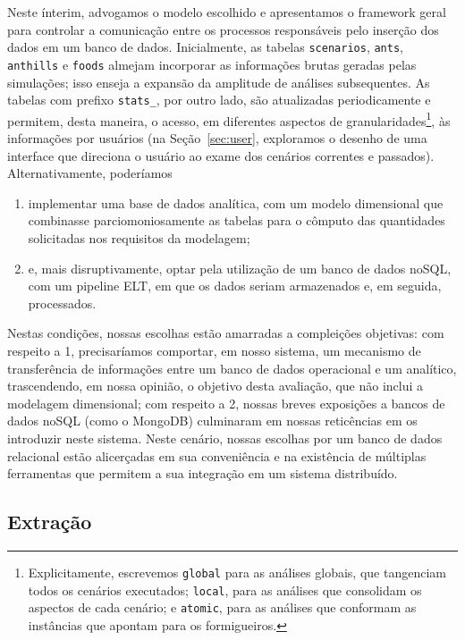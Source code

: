 \documentclass[12pt,oneside,a4paper]{article}
\begin{document}
	Neste ínterim, advogamos o modelo escolhido e apresentamos o framework geral para controlar a comunicação entre os processos responsáveis pelo inserção dos dados em um banco de dados. Inicialmente, as tabelas \texttt{scenarios}, \texttt{ants}, \texttt{anthills} e \texttt{foods} almejam incorporar as informações brutas geradas pelas simulações; isso enseja a expansão da amplitude de análises subsequentes. As tabelas com prefixo \texttt{stats\_}, por outro lado, são atualizadas periodicamente e permitem, desta maneira, o acesso, em diferentes aspectos de granularidades\footnote{Explicitamente, escrevemos \texttt{global} para as análises globais, que tangenciam todos os cenários executados; \texttt{local}, para as análises que consolidam os aspectos de cada cenário; e \texttt{atomic}, para as análises que conformam as instâncias que apontam para os formigueiros.}, às informações por usuários (na Seção~\ref{sec:user}, exploramos o desenho de uma interface que direciona o usuário ao exame dos cenários correntes e passados). Alternativamente, poderíamos 

	\begin{enumerate} 
		\item implementar uma base de dados analítica, com um modelo dimensional que combinasse parciomoniosamente as tabelas para o cômputo das quantidades solicitadas nos requisitos da modelagem;
		\item e, mais disruptivamente, optar pela utilização de um banco de dados noSQL, com um pipeline ELT, em que os dados seriam armazenados e, em seguida, processados. 
	\end{enumerate} 

	\noindent Nestas condições, nossas escolhas estão amarradas a compleições objetivas: com respeito a 1, precisaríamos comportar, em nosso sistema, um mecanismo de transferência de informações entre um banco de dados operacional e um analítico, trascendendo, em nossa opinião, o objetivo desta avaliação, que não inclui a modelagem dimensional; com respeito a 2, nossas breves exposições a bancos de dados noSQL (como o MongoDB) culminaram em nossas reticências em os introduzir neste sistema. Neste cenário, nossas escolhas por um banco de dados relacional estão alicerçadas em sua conveniência e na existência de múltiplas ferramentas que permitem a sua integração em um sistema distribuído. 

\subsection{Extração}
\end{document}
